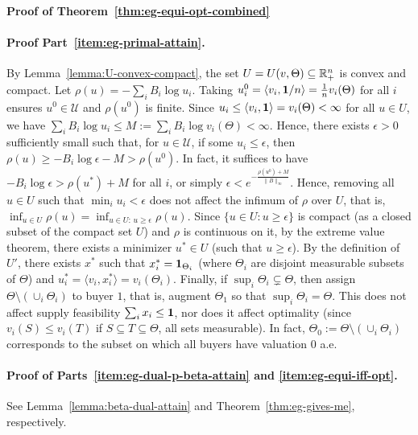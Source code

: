 	\smallskip\noindent\textbf{Proof of Theorem~\ref{thm:eg-equi-opt-combined}}

	\paragraph{Proof Part~\ref{item:eg-primal-attain}.}
	By Lemma~\ref{lemma:U-convex-compact}, the set $U = U(v, \Theta) \subseteq \mathbb{R}_+^n$ is convex and compact. Let $\rho(u) = -\sum_i B_i \log u_i$. Taking $u^0_i = \langle v_i, \mathbf{1}/n \rangle = \frac{1}{n} v_i(\Theta)$ for all $i$ ensures $u^0\in \mathcal{U}$ and $\rho(u^0)$ is finite. Since
	$u_i \leq \langle v_i, \mathbf{1} \rangle = v_i(\Theta) < \infty$
	for all $u\in U$, we have 
	$\sum_i B_i \log u_i \leq M:= \sum_i B_i \log v_i(\Theta) < \infty$.
	Hence, there exists $\epsilon>0$ sufficiently small such that, for $u\in \mathcal{U}$, if some $u_i \leq \epsilon$, then 
	$\rho(u) \geq - B_i \log \epsilon - M > \rho(u^0)$. 
	In fact, it suffices to have $- B_i \log \epsilon > \rho(u^*) + M$ for all $i$, or simply
	$\epsilon < e^{-\frac{\rho(u^0)+M}{\|B\|_\infty}}$.
	Hence, removing all $u\in U$ such that $\min_i u_i < \epsilon$ does not affect the infimum of $\rho$ over $U$, that is, 
	$\inf_{u \in U} \rho(u) = \inf_{u\in U:\, u\geq \epsilon} \rho(u)$.
	Since $\{ u\in U: u\geq \epsilon \}$ is compact (as a closed subset of the compact set $U$) and $\rho$ is continuous on it, by the extreme value theorem, there exists a minimizer $u^*\in U$ (such that $u\geq \epsilon$). 
	By the definition of $U'$, there exists $x^*$ such that $x^*_i = \mathbf{1}_{\Theta_i}$ (where $\Theta_i$ are disjoint measurable subsets of $\Theta$) and
	 $u^*_i = \langle v_i, x^*_i \rangle = v_i(\Theta_i)$.
	Finally, if $\sup_i \Theta_i \subsetneq \Theta$, then assign $\Theta\setminus (\cup_i \Theta_i)$ to buyer $1$, that is, augment $\Theta_1$ so that $\sup_i \Theta_i = \Theta$. This does not affect supply feasibility $\sum_i x_i \leq \mathbf{1}$, nor does it affect optimality (since $v_i(S) \leq v_i(T)$ if $S\subseteq T \subseteq \Theta$, all sets measurable). In fact, $\Theta_0 := \Theta\setminus (\cup_i \Theta_i)$ corresponds to the subset on which all buyers have valuation $0$ a.e.

	\paragraph{Proof of Parts~\ref{item:eg-dual-p-beta-attain} and \ref{item:eg-equi-iff-opt}.} See Lemma~\ref{lemma:beta-dual-attain} and Theorem~\ref{thm:eg-gives-me}, respectively.

